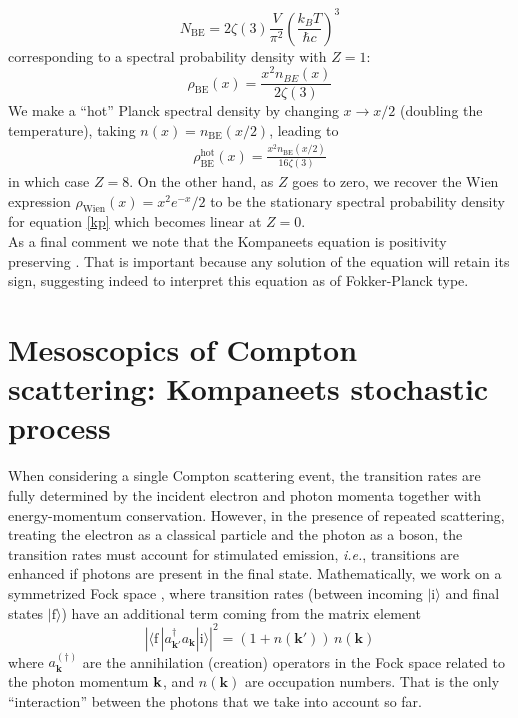 \documentclass[a4paper,12pt,reqno,superscriptaddress,nofootinbib]{revtex4}
\newcommand{\0}{^{(0)}}
\newcommand{\1}{^{(1)}}
\newcommand{\2}{^{(2)}}
\begin{document}
\[
N_\text{BE} = 2 \zeta(3) \frac{V}{\pi^2} \left( \frac{k_B T}{\hbar c} \right)^3
\]
corresponding to a spectral probability density with $Z = 1$:
\begin{equation}\label{eq:bespd}
\rho_\text{BE}(x) = \frac{x^2 n_{BE}(x)}{2\zeta(3)}
\end{equation}
We make a ``hot'' Planck spectral density by changing $x\rightarrow x/2$ (doubling the temperature), taking $n(x) = n_\text{BE}(x/2)$, leading to
\begin{eqnarray}\label{hott}
\rho_\text{BE}^\text{hot}(x) = \frac{x^2 n_\text{BE}(x/2)}{16\zeta(3)}
\end{eqnarray}
in which case $Z=8$.  On the other hand, as $Z$ goes to zero, we recover the Wien expression $\rho_\text{Wien}(x) = x^2 e^{-x}/2$ to be the stationary spectral probability density for equation \eqref{kp} which becomes linear at $Z=0$.\\


As a final comment we note that the Kompaneets equation is positivity preserving \cite{positivity}. That is important because any solution of the equation will retain its sign, suggesting indeed to interpret this equation as of Fokker-Planck type. 

\section{Mesoscopics of Compton scattering: Kompaneets stochastic 
process}\label{ksp}	

When considering a single Compton scattering event, the transition rates are fully determined by the incident electron and photon momenta together with energy-momentum conservation. However, in the presence of repeated scattering, treating the electron as a classical particle and the photon as a boson, the transition rates must account for stimulated emission, \textit{i.e.}, transitions are enhanced if photons are present in the final state. Mathematically, we work on a symmetrized Fock space  \cite{kadanoff}, where transition rates (between incoming  $|\text{i}\rangle$ and final states $|\text{f}\rangle$) have an additional term coming from the matrix element
\begin{equation}
\left|\langle \text{f}\,| a^\dagger_{{\mathbf k'}}a_{\mathbf k}|\text{i}\rangle\right|^2 = (1+n({\mathbf k'}))\,n({\mathbf k})
\end{equation}
where $a^{(\dagger)}_{\mathbf k}$ are the annihilation (creation) operators in the Fock space  related to the photon momentum $\vb{k}$, and $n({\mathbf k})$ are occupation numbers.  That is the only ``interaction'' between the photons that we take into account so far.
\end{document}
